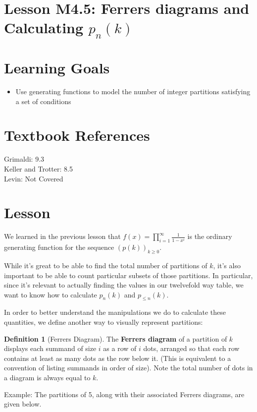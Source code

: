 \documentclass{article}
\theoremstyle{definition}
\newtheorem{definition}{Definition}
\begin{document}
\section*{Lesson M4.5: Ferrers diagrams and Calculating $p_{n}(k)$}
\section*{Learning Goals}
\begin{itemize}
  \item Use generating functions to model the number of integer partitions satisfying a set of conditions
\end{itemize}

\section*{Textbook References}
Grimaldi: 9.3\\
Keller and Trotter: 8.5\\
Levin: Not Covered

\section*{Lesson}
We learned in the previous lesson that $f(x)=\prod_{i=1}^{\infty} \frac{1}{1-x^{i}}$ is the ordinary generating function for the sequence $(p(k))_{k \geq 0}$.

While it's great to be able to find the total number of partitions of $k$, it's also important to be able to count particular subsets of those partitions. In particular, since it's relevant to actually finding the values in our twelvefold way table, we want to know how to calculate $p_{n}(k)$ and $p_{\leq n}(k)$.

In order to better understand the manipulations we do to calculate these quantities, we define another way to visually represent partitions:

\begin{definition}[Ferrers Diagram]
The \textbf{Ferrers diagram} of a partition of $k$ displays each summand of size $i$ as a row of $i$ dots, arranged so that each row contains at least as many dots as the row below it. (This is equivalent to a convention of listing summands in order of size). Note the total number of dots in a diagram is always equal to $k$.
\end{definition}

Example: The partitions of 5, along with their associated Ferrers diagrams, are given below.\\
\end{document}
